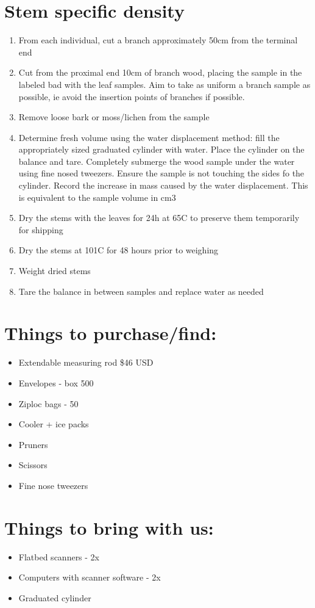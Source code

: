 \documentclass[11pt,letter]{article}
\begin{document}
\section{Stem specific density}
\begin{enumerate}
\item From each individual, cut a branch approximately 50cm from the terminal end 
\item Cut from the proximal end 10cm of branch wood, placing the sample in the labeled bad with the leaf samples. Aim to take as uniform a branch sample as possible, ie avoid the insertion points of branches if possible.
\item Remove loose bark or moss/lichen from the sample
\item Determine fresh volume using the water displacement method: fill the appropriately sized graduated cylinder with water. Place the cylinder on the balance and tare. Completely submerge the wood sample under the water using fine nosed tweezers. Ensure the sample is not touching the sides fo the cylinder. Record the increase in mass caused by the water displacement. This is equivalent to the sample volume in cm3
\item Dry the stems with the leaves for 24h at 65C to preserve them temporarily for shipping
\item Dry the stems at 101C for 48 hours prior to weighing
\item Weight dried stems 
\item Tare the balance in between samples and replace water as needed
\end{enumerate}

\section{Things to purchase/find:}
\begin{itemize}
\item Extendable measuring rod \$46 USD
\item Envelopes - box 500 
\item Ziploc bags - 50
\item Cooler + ice packs
\item Pruners
\item Scissors 
\item Fine nose tweezers
\end{itemize}

\section{Things to bring with us:}

\begin{itemize}
\item Flatbed scanners - 2x
\item Computers with scanner software - 2x
\item Graduated cylinder
\end{itemize}
\end{document}

